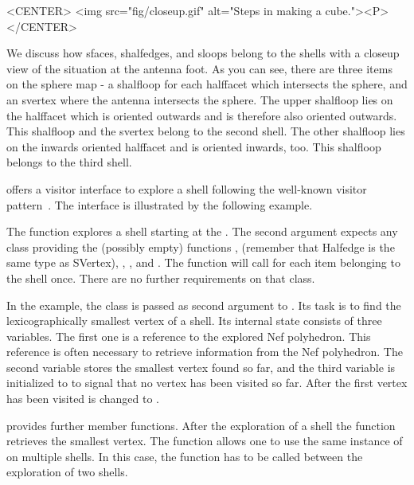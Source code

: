 \begin{ccHtmlOnly}
    <CENTER>
        <img src="fig/closeup.gif" alt="Steps in making a cube."><P>
    </CENTER>
\end{ccHtmlOnly}

We discuss how sfaces, shalfedges, and sloops belong to the shells
with a closeup view of the situation at the antenna foot. As you can
see, there are three items on the sphere map - a shalfloop for each
halffacet which intersects the sphere, and an svertex where the
antenna intersects the sphere. The upper shalfloop lies on the 
halffacet which is oriented outwards and is therefore also 
oriented outwards. This shalfloop and the svertex belong to the
second shell.
The other shalfloop lies on the inwards oriented halffacet and is 
oriented inwards, too. This shalfloop belongs to the third shell. 

 offers a visitor interface to explore a shell
following the well-known visitor pattern~\cite{cgal:ghjv-dpero-95}.
The interface is illustrated by the following example.


The function  explores a shell starting at the . The second argument
expects any class providing the (possibly empty) functions
, 
(remember that Halfedge is the same type as SVertex),
,
,
 and
.  The 
function will call  for each item belonging to the shell
once. There are no further requirements on that class.

In the example, the class  is passed as second argument
to . Its task is to find the lexicographically
smallest vertex of a shell. Its internal state consists of three variables. 
The first one is a reference to the explored Nef polyhedron. This reference
is often necessary to retrieve information from the Nef polyhedron. The
second variable  stores the smallest vertex found so far, and
the third variable  is initialized to  to signal that no
vertex has been visited so far. After the first vertex has been visited 
 is changed to .

 provides further member functions. After the
exploration of a shell the  function retrieves the
smallest vertex. The  function allows one to
use the same instance of  on multiple shells. In
this case, the  function has to be called
between the exploration of two shells.

